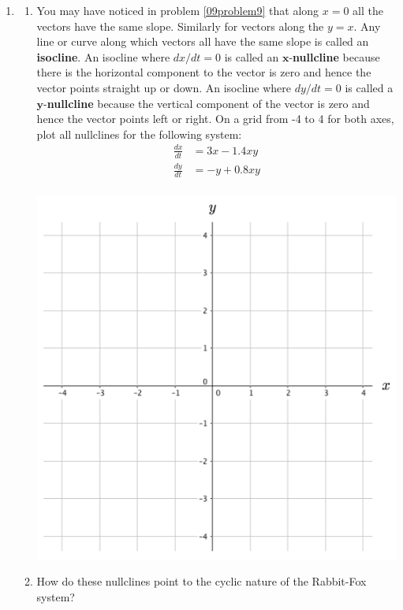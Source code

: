 \begin{enumerate}[resume]
\item	
\label{09problem10}
\begin{enumerate}
\item You may have noticed in problem \ref{09problem9} that along $x = 0$ all the vectors have the same slope. Similarly for vectors along the $y = x$. Any line or curve along which vectors all have the same slope is called an \textbf{isocline}. An isocline where $dx/dt = 0$ is called an $\mathbf{x}$-\textbf{nullcline} because there is the horizontal component to the vector is zero and hence the vector points straight up or down. An isocline where $dy/dt = 0$ is called a $\mathbf{y}$-\textbf{nullcline} because the vertical component of the vector is zero and hence the vector points left or right. On a grid from -4 to 4 for both axes, plot all nullclines for the following system: \label{09problem10parta}
\begin{align*}
\frac{dx}{dt} &= 3x-1.4xy\\
\frac{dy}{dt} &= -y+0.8xy\\ 
\end{align*}
\begin{center}
\includegraphics[width=5in]{11/11VectorField2.png}
\end{center}
\item How do these nullclines point to the cyclic nature of the Rabbit-Fox system? \label{09problem10partb}
\end{enumerate}


\end{enumerate}
